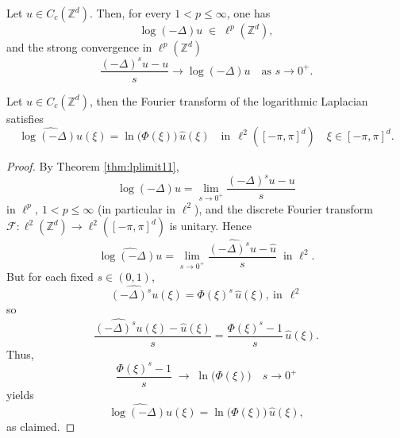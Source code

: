 \documentclass[10pt,a4paper]{amsart}
\begin{document}
\begin{theorem}\label{thm:lplimit11}
	Let \(u\in C_c(\mathbb{Z}^d)\).  Then, for every \(1<p\le\infty\), one has
	\[
\log\left(-\Delta\right)u
	\;\in\;\ell^p(\mathbb{Z}^d),\]
	and the strong convergence in $\ell^p\left(\mathbb{Z}^d\right)$
	\[\frac{(-\Delta)^s u - u}{s}\longrightarrow
\log\left(-\Delta\right)u
	\quad\text{as }s\to0^+.
	\]
\end{theorem}

\begin{proposition}
	Let \(u\in C_c(\mathbb{Z}^d)\), then the Fourier transform of the logarithmic Laplacian satisfies
	\[
	\widehat{\log\left(-\Delta\right)u}(\xi)
	=\ln\!\bigl(\Phi(\xi)\bigr)\,\widehat u(\xi)\quad \text{in}\:\:\ell^2([-\pi,\pi]^d)
	\quad \xi\in[-\pi,\pi]^d.
	\]
\end{proposition}

\begin{proof}
	By Theorem \ref{thm:lplimit11}, 
	\[
	\log\left(-\Delta\right)u
	=\lim_{s\to0^+}\frac{(-\Delta)^s u - u}{s}
	\]
	in \(\ell^p,\:1<p\le \infty\) (in particular in \(\ell^2\)), and the discrete Fourier transform
	\(\mathcal F:\ell^2(\mathbb{Z}^d)\to \ell^2([-\pi,\pi]^d)\) is unitary.  Hence
	\[
	\widehat{\log\left(-\Delta\right)u}
	=\lim_{s\to0^+}
	\frac{\widehat{(-\Delta)^s u}-\widehat u}{s}
	\;\;\text{in }\ell^2.
	\]
	But for each fixed \(s\in(0,1)\),
	\[
	\widehat{(-\Delta)^s u}(\xi)
	=\Phi(\xi)^s\,\widehat u(\xi),\:\text{in}\:\:\ell^2
	\]
	so
	\[
	\frac{\widehat{(-\Delta)^s u}(\xi)-\widehat u(\xi)}{s}
	=\frac{\Phi(\xi)^s-1}{s}\,\widehat u(\xi).
	\]
Thus,
	\[
	\frac{\Phi(\xi)^s-1}{s}\;\longrightarrow\;\ln\!\bigl(\Phi(\xi)\bigr)
	\quad s\to0^+
	\]
yields
	\[
	\widehat{\log\left(-\Delta\right)u}(\xi)
	=\ln\!\bigl(\Phi(\xi)\bigr)\,\widehat u(\xi),
	\]
	as claimed.
\end{proof}
\end{document}
